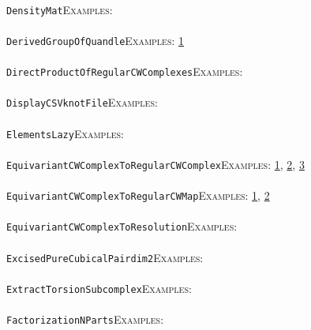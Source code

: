 \documentclass[a4paper,11pt]{report}
\begin{document}
{{ \\
 \texttt{DensityMat}{\nobreakspace}{\nobreakspace}{\nobreakspace}{\nobreakspace}\textsc{Examples:} \\
 \\
 \texttt{DerivedGroupOfQuandle}{\nobreakspace}{\nobreakspace}{\nobreakspace}{\nobreakspace}\textsc{Examples:} \href{../www/SideLinks/About/aboutQuandles.html} {1}{\nobreakspace} \\
 \\
 \texttt{DirectProductOfRegularCWComplexes}{\nobreakspace}{\nobreakspace}{\nobreakspace}{\nobreakspace}\textsc{Examples:} \\
 \\
 \texttt{DisplayCSVknotFile}{\nobreakspace}{\nobreakspace}{\nobreakspace}{\nobreakspace}\textsc{Examples:} \\
 \\
 \texttt{ElementsLazy}{\nobreakspace}{\nobreakspace}{\nobreakspace}{\nobreakspace}\textsc{Examples:} \\
 \\
 \texttt{EquivariantCWComplexToRegularCWComplex}{\nobreakspace}{\nobreakspace}{\nobreakspace}{\nobreakspace}\textsc{Examples:} \href{tutorial/chap3.html} {1}{\nobreakspace}, \href{../www/SideLinks/About/aboutCoveringSpaces.html} {2}{\nobreakspace}, \href{../www/SideLinks/About/aboutCoverinSpaces.html} {3}{\nobreakspace} \\
 \\
 \texttt{EquivariantCWComplexToRegularCWMap}{\nobreakspace}{\nobreakspace}{\nobreakspace}{\nobreakspace}\textsc{Examples:} \href{../www/SideLinks/About/aboutCoveringSpaces.html} {1}{\nobreakspace}, \href{../www/SideLinks/About/aboutCoverinSpaces.html} {2}{\nobreakspace} \\
 \\
 \texttt{EquivariantCWComplexToResolution}{\nobreakspace}{\nobreakspace}{\nobreakspace}{\nobreakspace}\textsc{Examples:} \\
 \\
 \texttt{ExcisedPureCubicalPair{\textunderscore}dim{\textunderscore}2}{\nobreakspace}{\nobreakspace}{\nobreakspace}{\nobreakspace}\textsc{Examples:} \\
 \\
 \texttt{ExtractTorsionSubcomplex}{\nobreakspace}{\nobreakspace}{\nobreakspace}{\nobreakspace}\textsc{Examples:} \\
 \\
 \texttt{FactorizationNParts}{\nobreakspace}{\nobreakspace}{\nobreakspace}{\nobreakspace}\textsc{Examples:} \\
}}
\end{document}
